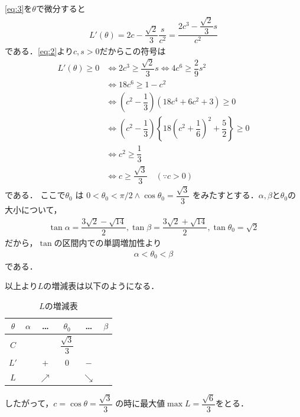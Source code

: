\documentclass[../../main.tex]{subfiles}
\begin{document}
\cref{eq:3}を$\theta$で微分すると
\begin{align}
  L'(\theta)
  = 2c - \dfrac{\sqrt{2}}{3}\dfrac{s}{c^2}
  = \dfrac{2c^3 - \dfrac{\sqrt{2}}{3}s}{c^2}
\end{align}
である．\cref{eq:2}より$c,s>0$だからこの符号は
\begin{align}
  L'(\theta) \ge 0
  &\iff
  2c^3 \ge \dfrac{\sqrt{2}}{3}s
  \iff
  4c^6 \ge \dfrac{2}{9}s^2 \\
  &\iff
  18c^6 \ge 1-c^2 \\
  &\iff
  (c^2 - \dfrac{1}{3})(18c^4 + 6c^2 + 3) \ge 0 \\
  &\iff
  (c^2 - \dfrac{1}{3})\left\{ 18\left(c^2+\dfrac{1}{6}\right)^2 + \dfrac{5}{2} \right\} \ge 0 \\
  &\iff
  c^2 \ge \dfrac{1}{3} \\
  &\iff
  c \ge \dfrac{\sqrt{3}}{3} \quad (\because c>0)
\end{align}
である．
ここで$\theta_0$ は $0 < \theta_0 < \pi/2 \land \cos\theta_0 = \dfrac{\sqrt{3}}{3}$ をみたすとする．$\alpha,\beta$と$\theta_0$の大小について，
\begin{align}
  \tan\alpha = \dfrac{3\sqrt{2}-\sqrt{14}}{2},
  \tan\beta = \dfrac{3\sqrt{2}+\sqrt{14}}{2},
  \tan\theta_0 = \sqrt{2}
\end{align}
だから，$\tan$の区間内での単調増加性より
\begin{align}
  \alpha < \theta_0 < \beta
\end{align}
である．

以上より$L$の増減表は以下のようになる．

\begin{table}[htb]
  \centering
  \caption{$L$の増減表}
  \begin{tabular}{c|ccccc}
    $\theta$ & $\alpha$ & \dots & $\theta_0$ & \dots & $\beta$ \\ \hline
    $C$ & & & $\dfrac{\sqrt{3}}{3}$ & & \\ \hline
    $L'$ & & $+$ & $0$ & $-$ & \\ \hline
    $L$ & & $\nearrow$ & & $\searrow$ &
  \end{tabular}
\end{table}

したがって，$c = \cos\theta = \dfrac{\sqrt{3}}{3}$ の時に最大値$\max L = \dfrac{\sqrt{6}}{3}$をとる．
\end{document}
